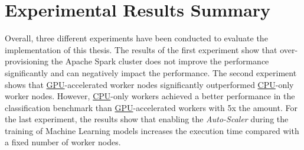 \section{Experimental Results Summary}
Overall, three different experiments have been conducted to evaluate the implementation of this thesis.
The results of the first experiment show that over-provisioning the Apache Spark cluster does not improve the performance significantly and can negatively impact the performance. 
The second experiment shows that \hyperlink{abbr:gpu}{GPU}-accelerated worker nodes significantly outperformed \hyperlink{abbr:cpu}{CPU}-only worker nodes. However, \hyperlink{abbr:cpu}{CPU}-only workers achieved a better performance in the classification benchmark than \hyperlink{abbr:gpu}{GPU}-accelerated workers with 5x the amount.
For the last experiment, the results show that enabling the \textit{Auto-Scaler} during the training of Machine Learning models increases the execution time compared with a fixed number of worker nodes.
